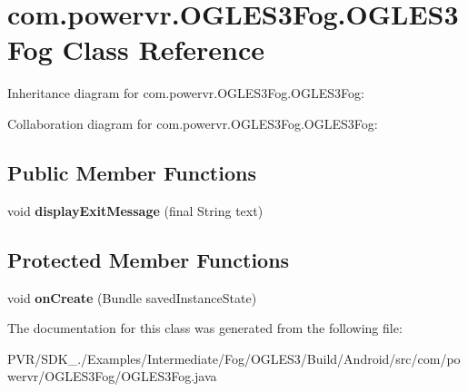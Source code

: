 \hypertarget{classcom_1_1powervr_1_1_o_g_l_e_s3_fog_1_1_o_g_l_e_s3_fog}{\section{com.\+powervr.\+O\+G\+L\+E\+S3\+Fog.\+O\+G\+L\+E\+S3\+Fog Class Reference}
\label{classcom_1_1powervr_1_1_o_g_l_e_s3_fog_1_1_o_g_l_e_s3_fog}
}


Inheritance diagram for com.\+powervr.\+O\+G\+L\+E\+S3\+Fog.\+O\+G\+L\+E\+S3\+Fog\+:


Collaboration diagram for com.\+powervr.\+O\+G\+L\+E\+S3\+Fog.\+O\+G\+L\+E\+S3\+Fog\+:
\subsection*{Public Member Functions}
\begin{DoxyCompactItemize}
\item 
\hypertarget{classcom_1_1powervr_1_1_o_g_l_e_s3_fog_1_1_o_g_l_e_s3_fog_a13de16e67a30f62c89e082b9adb1d61b}{void {\bfseries display\+Exit\+Message} (final String text)}\label{classcom_1_1powervr_1_1_o_g_l_e_s3_fog_1_1_o_g_l_e_s3_fog_a13de16e67a30f62c89e082b9adb1d61b}

\end{DoxyCompactItemize}
\subsection*{Protected Member Functions}
\begin{DoxyCompactItemize}
\item 
\hypertarget{classcom_1_1powervr_1_1_o_g_l_e_s3_fog_1_1_o_g_l_e_s3_fog_ab1b59300e43fe95be69099390a29856d}{void {\bfseries on\+Create} (Bundle saved\+Instance\+State)}\label{classcom_1_1powervr_1_1_o_g_l_e_s3_fog_1_1_o_g_l_e_s3_fog_ab1b59300e43fe95be69099390a29856d}

\end{DoxyCompactItemize}


The documentation for this class was generated from the following file\+:\begin{DoxyCompactItemize}
\item 
P\+V\+R/\+S\+D\+K\+\_./\+Examples/\+Intermediate/\+Fog/\+O\+G\+L\+E\+S3/\+Build/\+Android/src/com/powervr/\+O\+G\+L\+E\+S3\+Fog/O\+G\+L\+E\+S3\+Fog.\+java\end{DoxyCompactItemize}
